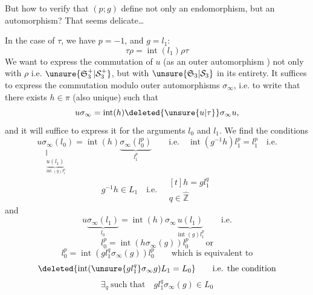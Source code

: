 But how to verify that $(p;g)$ define not only an endomorphism, but an automorphism? That seems delicate\ldots

In the case of $\tau$, we have $p=-1$, and $g=l_1$:
\[
\tau\rho=\operatorname{int}(l_1)\rho\tau
\]
We want to express the commutation of $u$ (as an outer automorphism ) not only with $\rho$ i.e. $\unsure{\mathfrak S_3^+|\mathcal S_3^+}$,
but with $\unsure{\mathfrak S_3|\mathcal S_3}$ in its entirety. It suffices to express the commutation modulo outer automorphisms  $\sigma_\infty$, i.e. to write that there exists $h\in\pi$ (also unique) such that
\[
u\sigma_\infty=\operatorname{int}(h)\deleted{\unsure{u|\tau}}\sigma_\infty u,
\]
and it will suffice to express it for the arguments $l_0$ and $l_1$. We find the conditions
\[
\underset{\substack{\Vert\\\underbrace{u(l_1)}_{\operatorname{int}(g)l_1^p}}}{u\sigma_\infty(l_0)}=\operatorname{int}(h)\underbrace{\sigma_\infty(l_0^p)}_{l_1^p}
\qquad\text{i.e.}\quad\operatorname{int}(g^{-1}h)l_1^p=l_1^p\quad\text{i.e.}
\]
\[
g^{-1}h\in L_1\quad\text{i.e.}\quad \begin{gathered}[t]h=gl_1^q\\q\in\hat{\mathbb Z}\end{gathered}
\]
and
\[
u\underbrace{\sigma_\infty(l_1)}_{l_0}=\operatorname{int}(h)\sigma_\infty\underbrace{u(l_1)}_{\operatorname{int}(g)l_1^p}\qquad\text{i.e.}
\]
\[
l_0^p=\operatorname{int}(h\sigma_\infty(g))l_0^p\qquad\text{or}
\]
\[
l_0^p=\operatorname{int}(gl_1^q\sigma_\infty(g))l_0^p\qquad\text{which is equivalent to}
\]
\[
\deleted{\operatorname{int}(\unsure{gl_1^q}\sigma_\infty g)L_1=L_0}\qquad\text{i.e. the condition}
\]
\[
\exists_q\ \text{such that}\quad gl_1^q\sigma_\infty(g)\in L_0
\]
